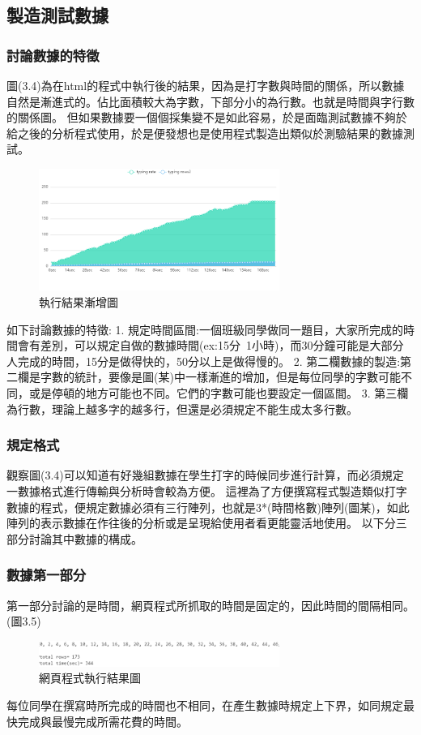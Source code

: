 \subsection{製造測試數據}
\subsubsection{討論數據的特徵}
圖(3.4)為在html的程式中執行後的結果，因為是打字數與時間的關係，所以數據自然是漸進式的。佔比面積較大為字數，下部分小的為行數。也就是時間與字行數的關係圖。
但如果數據要一個個採集變不是如此容易，於是面臨測試數據不夠於給之後的分析程式使用，於是便發想也是使用程式製造出類似於測驗結果的數據測試。
	\begin{figure}[H] %
	\centering %
	\includegraphics[width=0.7\textwidth]{4.png} %
	\caption{執行結果漸增圖} %
	\label{Fig.3.4} %
	\end{figure}
如下討論數據的特徵:
1. 規定時間區間:一個班級同學做同一題目，大家所完成的時間會有差別，可以規定自做的數據時間(ex:15分~1小時)，而30分鐘可能是大部分人完成的時間，15分是做得快的，50分以上是做得慢的。
2. 第二欄數據的製造:第二欄是字數的統計，要像是圖(某)中一樣漸進的增加，但是每位同學的字數可能不同，或是停頓的地方可能也不同。它們的字數可能也要設定一個區間。
3. 第三欄為行數，理論上越多字的越多行，但還是必須規定不能生成太多行數。
\subsubsection{規定格式}
觀察圖(3.4)可以知道有好幾組數據在學生打字的時候同步進行計算，而必須規定一數據格式進行傳輸與分析時會較為方便。
這裡為了方便撰寫程式製造類似打字數據的程式，便規定數據必須有三行陣列，也就是3*(時間格數)陣列(圖某)，如此陣列的表示數據在作往後的分析或是呈現給使用者看更能靈活地使用。
以下分三部分討論其中數據的構成。
\subsubsection{數據第一部分}
第一部分討論的是時間，網頁程式所抓取的時間是固定的，因此時間的間隔相同。(圖3.5)
	\begin{figure}[H] %
	\centering %
	\includegraphics[width=0.7\textwidth]{3_2_1_3.png} %
	\caption{網頁程式執行結果圖} %
	\label{Fig.3.5} %
	\end{figure}
每位同學在撰寫時所完成的時間也不相同，在產生數據時規定上下界，如同規定最快完成與最慢完成所需花費的時間。

